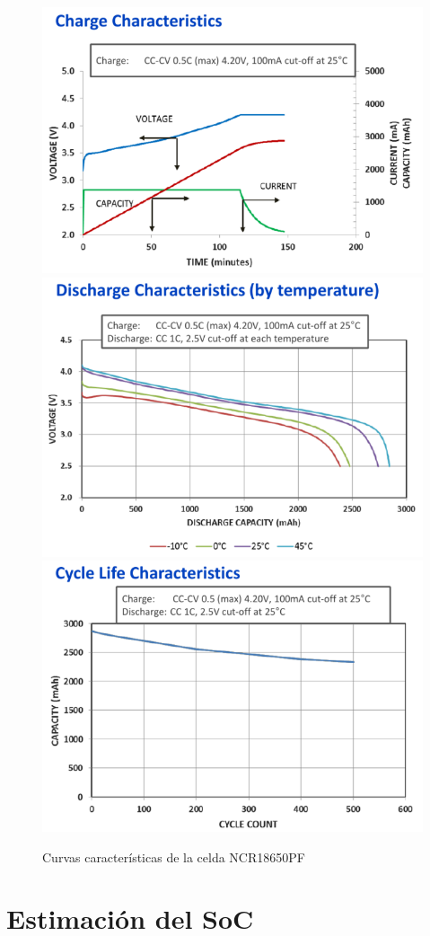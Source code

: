 \documentclass[10pt]{beamer}
\theoremstyle{remark}
\theoremstyle{definition}
\begin{document}
\begin{frame}
  \begin{figure}[h!]
	\centering
	\includegraphics[width=.32\textwidth]{images/cc_cv_18650}\hfill
	\includegraphics[width=.32\textwidth]{images/discharge_18650}\hfill
	\includegraphics[width=.32\textwidth]{images/life_cycle_18650}
	\caption{Curvas características de la celda NCR18650PF}
  \end{figure}

\end{frame}

\section{Estimación del SoC}
\end{document}
